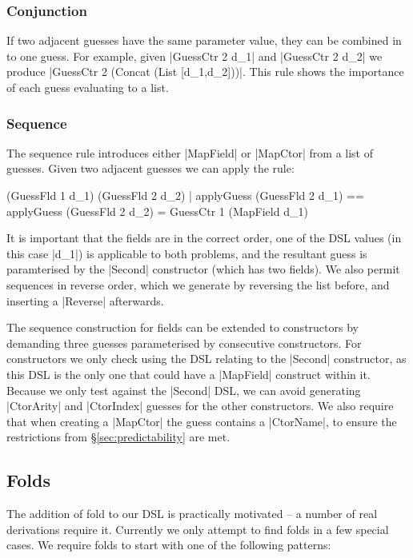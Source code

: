 \documentclass{llncs}
\begin{document}
\subsubsection{Conjunction}

If two adjacent guesses have the same parameter value, they can be combined in to one guess. For example, given |GuessCtr 2 d_1| and |GuessCtr 2 d_2| we produce |GuessCtr 2 (Concat (List [d_1,d_2]))|. This rule shows the importance of each guess evaluating to a list.

\subsubsection{Sequence}
\label{sec:guess_lists_sequence}

The sequence rule introduces either |MapField| or |MapCtor| from a list of guesses. Given two adjacent guesses we can apply the rule:

\ignore\begin{code}
(GuessFld 1 d_1) (GuessFld 2 d_2)
    | applyGuess (GuessFld 2 d_1) == applyGuess (GuessFld 2 d_2)
    = GuessCtr 1 (MapField d_1)
\end{code}

It is important that the fields are in the correct order, one of the DSL values (in this case |d_1|) is applicable to both problems, and the resultant guess is paramterised by the |Second| constructor (which has two fields). We also permit sequences in reverse order, which we generate by reversing the list before, and inserting a |Reverse| afterwards.

The sequence construction for fields can be extended to constructors by demanding three guesses parameterised by consecutive constructors. For constructors we only check using the DSL relating to the |Second| constructor, as this DSL is the only one that could have a |MapField| construct within it. Because we only test against the |Second| DSL, we can avoid generating |CtorArity| and |CtorIndex| guesses for the other constructors. We also require that when creating a |MapCtor| the guess contains a |CtorName|, to ensure the restrictions from \S\ref{sec:predictability} are met.

\subsection{Folds}

The addition of fold to our DSL is practically motivated -- a number of real derivations require it. Currently we only attempt to find folds in a few special cases. We require folds to start with one of the following patterns:
\end{document}
